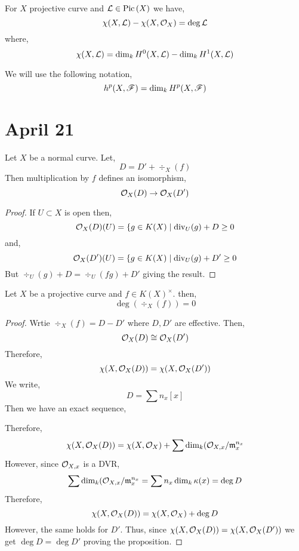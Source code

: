 \documentclass[12pt]{article}
\begin{document}
\begin{theorem}
For $X$ projective curve and $\mathcal{L} \in \mathrm{Pic} \left( X \right)$ we have,
\[ \chi(X, \mathcal{L}) - \chi(X, \mathcal{O}_{X}) = \deg{\mathcal{L}} \]
where,
\[ \chi(X, \mathcal{L}) = \dim_k H^0(X, \mathcal{L}) - \dim_k H^1(X, \mathcal{L}) \]
\end{theorem}

\begin{rmk}
We will use the following notation,
\[ h^p(X, \mathscr{F}) = \dim_k H^p(X, \mathscr{F}) \]
\end{rmk}

\section{April 21}

\begin{lemma}
Let $X$ be a normal curve. Let,
\[ D = D' + \div_X{(f)} \]
Then multiplication by $f$ defines an isomorphism,
\[ \mathcal{O}_{X}(D) \to \mathcal{O}_{X}(D') \]
\end{lemma}

\begin{proof}
If $U \subset X$ is open then,
\[ \mathcal{O}_{X}(D)(U) = \{ g \in K(X) \mid \mathrm{div}_U(g) + D \ge 0 \]
and,
\[ \mathcal{O}_{X}(D')(U) = \{ g \in K(X) \mid \mathrm{div}_U(g) + D' \ge 0 \]
But $\div_U(g) + D = \div_U(fg) + D'$ giving the result. 
\end{proof}

\begin{lemma}
Let $X$ be a projective curve and $f \in K(X)^\times$. then,
\[ \deg{(\div_X(f))} = 0 \]
\end{lemma}

\begin{proof}
Wrtie $\div_X{(f)} = D - D'$ where $D, D'$ are effective. Then,
\[ \mathcal{O}_{X}(D) \cong \mathcal{O}_{X}(D') \]
Therefore,
\[ \chi(X, \mathcal{O}_{X}(D)) = \chi(X, \mathcal{O}_{X}(D')) \]
We write,
\[ D = \sum n_x [x] \]
Then we have an exact sequence,
\begin{center}
\end{center}
Therefore,
\[ \chi(X, \mathcal{O}_{X}(D)) = \chi(X, \mathcal{O}_{X}) + \sum \dim_k (\mathcal{O}_{X, x} / \mathfrak{m}_x^{n_x} \]
However, since $\mathcal{O}_{X, x}$ is a DVR,
\[ \sum \dim_k (\mathcal{O}_{X, x} / \mathfrak{m}_x^{n_x} = \sum n_x \dim_k \kappa(x) = \deg{D} \]
Therefore,
\[ \chi(X, \mathcal{O}_{X}(D)) = \chi(X, \mathcal{O}_{X}) + \deg{D} \]
However, the same holds for $D'$. Thus, since $\chi(X, \mathcal{O}_{X}(D)) = \chi(X, \mathcal{O}_{X}(D'))$ we get $\deg{D} = \deg{D'}$ proving the proposition.
\end{proof}
\end{document}
